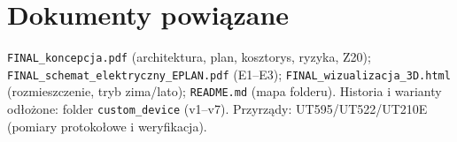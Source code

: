 \documentclass[11pt,a4paper]{article}
\begin{document}
\section{Dokumenty powiązane}
\texttt{FINAL\_koncepcja.pdf} (architektura, plan, kosztorys, ryzyka, Z20);
\texttt{FINAL\_schemat\_elektryczny\_EPLAN.pdf} (E1--E3); \texttt{FINAL\_wizualizacja\_3D.html}
(rozmieszczenie, tryb zima/lato); \texttt{README.md} (mapa folderu). Historia i warianty odłożone:
folder \texttt{custom\_device} (v1--v7). Przyrządy: UT595/UT522/UT210E (pomiary protokołowe
i weryfikacja).
\end{document}
